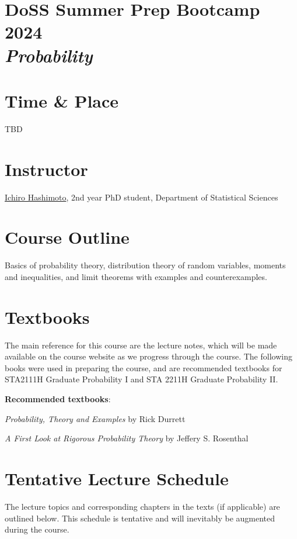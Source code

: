 \documentclass[12pt]{article}
\date{ }
\begin{document}
\section*{DoSS Summer Prep Bootcamp 2024 \\  {\it{Probability}}}

\section{Time \& Place}
TBD

\section{Instructor}
\href{your webpage}{Ichiro Hashimoto}, 2nd year PhD student, Department of Statistical Sciences



\section{Course Outline}

Basics of probability theory, distribution theory of random variables, moments and inequalities, and limit theorems with examples and counterexamples.

\section{Textbooks}

The main reference for this course are the lecture notes, which will be made available on the course website as we progress through the course. The following books were used in preparing the course, and are recommended textbooks for STA2111H Graduate Probability I and STA 2211H Graduate Probability II. 

\vspace{1.0cm}

{\bf{Recommended textbooks}}:
\vspace{0.1cm}
\noindent

{\emph{Probability, Theory and Examples}} by Rick Durrett

{\emph{A First Look at Rigorous Probability Theory}} by Jeffery S. Rosenthal

\newpage
\section{Tentative Lecture Schedule}
The lecture topics and corresponding chapters in the texts (if applicable) are outlined below.  This schedule is tentative and will inevitably be augmented during the course.  
\end{document}
